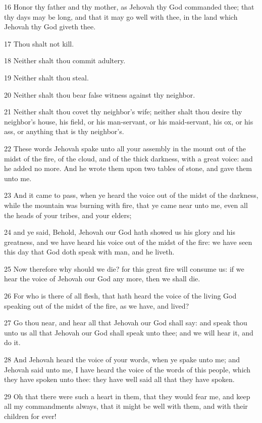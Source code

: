 \par 16 Honor thy father and thy mother, as Jehovah thy God commanded thee; that thy days may be long, and that it may go well with thee, in the land which Jehovah thy God giveth thee.
\par 17 Thou shalt not kill.
\par 18 Neither shalt thou commit adultery.
\par 19 Neither shalt thou steal.
\par 20 Neither shalt thou bear false witness against thy neighbor.
\par 21 Neither shalt thou covet thy neighbor's wife; neither shalt thou desire thy neighbor's house, his field, or his man-servant, or his maid-servant, his ox, or his ass, or anything that is thy neighbor's.
\par 22 These words Jehovah spake unto all your assembly in the mount out of the midst of the fire, of the cloud, and of the thick darkness, with a great voice: and he added no more. And he wrote them upon two tables of stone, and gave them unto me.
\par 23 And it came to pass, when ye heard the voice out of the midst of the darkness, while the mountain was burning with fire, that ye came near unto me, even all the heads of your tribes, and your elders;
\par 24 and ye said, Behold, Jehovah our God hath showed us his glory and his greatness, and we have heard his voice out of the midst of the fire: we have seen this day that God doth speak with man, and he liveth.
\par 25 Now therefore why should we die? for this great fire will consume us: if we hear the voice of Jehovah our God any more, then we shall die.
\par 26 For who is there of all flesh, that hath heard the voice of the living God speaking out of the midst of the fire, as we have, and lived?
\par 27 Go thou near, and hear all that Jehovah our God shall say: and speak thou unto us all that Jehovah our God shall speak unto thee; and we will hear it, and do it.
\par 28 And Jehovah heard the voice of your words, when ye spake unto me; and Jehovah said unto me, I have heard the voice of the words of this people, which they have spoken unto thee: they have well said all that they have spoken.
\par 29 Oh that there were such a heart in them, that they would fear me, and keep all my commandments always, that it might be well with them, and with their children for ever!
